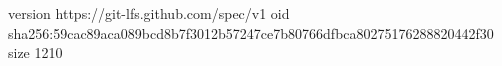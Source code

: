 version https://git-lfs.github.com/spec/v1
oid sha256:59cac89aca089bcd8b7f3012b57247ce7b80766dfbca80275176288820442f30
size 1210
